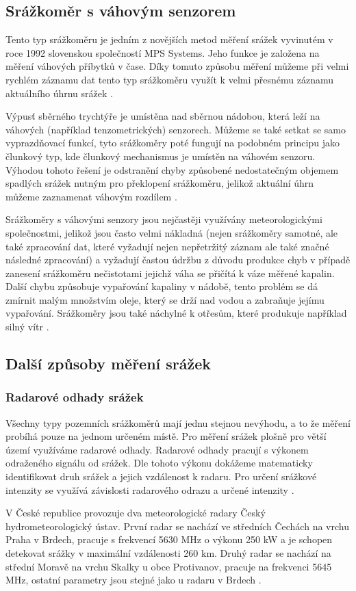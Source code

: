 \subsection{Srážkoměr s váhovým senzorem}
\par Tento typ srážkoměru je jedním z novějších metod měření srážek vyvinutém v roce 1992 slovenskou společností MPS Systems. Jeho funkce je založena na měření váhových příbytků v čase. Díky tomuto způsobu měření můžeme při velmi rychlém záznamu dat tento typ srážkoměru využít k velmi přesnému záznamu aktuálního úhrnu srážek \cite{ggXzrltWxOZUtGvb}.
\par Výpusť sběrného trychtýře je umístěna nad sběrnou nádobou, která leží na váhových (například tenzometrických) senzorech. Můžeme se také setkat se samo vyprazdňovací funkcí, tyto srážkoměry poté fungují na podobném principu jako člunkový typ, kde člunkový mechanismus je umístěn na váhovém senzoru. Výhodou tohoto řešení je odstranění chyby způsobené nedostatečným objemem spadlých srážek nutným pro překlopení srážkoměru, jelikož aktuální úhrn můžeme zaznamenat váhovým rozdílem \cite{ggXzrltWxOZUtGvb}. 
\par Srážkoměry s váhovými senzory jsou nejčastěji využívány meteorologickými společnostmi, jelikož jsou často velmi nákladná (nejen srážkoměry samotné, ale také zpracování dat, které vyžadují nejen nepřetržitý záznam ale také značné následné zpracování) a vyžadují častou údržbu z důvodu produkce chyb v případě zanesení srážkoměru nečistotami jejichž váha se přičítá k váze měřené kapalin. Další chybu způsobuje vypařování kapaliny v nádobě, tento problém se dá zmírnit malým množstvím oleje, který se drží nad vodou a zabraňuje jejímu vypařování. Srážkoměry jsou také náchylné k otřesům, které produkuje například silný vítr \cite{ggXzrltWxOZUtGvb}.

\subsection{Další způsoby měření srážek}

\subsubsection{Radarové odhady srážek}
\par Všechny typy pozemních srážkoměrů mají jednu stejnou nevýhodu, a to že měření probíhá pouze na jednom určeném místě. Pro měření srážek plošně pro větší území využíváme radarové odhady. 
Radarové odhady pracují s výkonem odraženého signálu od srážek. Dle tohoto výkonu dokážeme matematicky identifikovat druh srážek a jejich vzdálenost k radaru. Pro určení srážkové intenzity se využívá závislosti radarového odrazu a určené intenzity \cite{6eWEbsB9cSdSJAFB, Salek2012}.
\par V České republice provozuje dva meteorologické radary Český hydrometeorologický ústav. První radar se nachází ve středních Čechách na vrchu Praha v Brdech, pracuje s frekvencí 5630 MHz o výkonu 250 kW a je schopen detekovat srážky v maximální vzdálenosti 260 km. Druhý radar se nachází na střední Moravě na vrchu Skalky u obce Protivanov, pracuje na frekvenci 5645 MHz, ostatní parametry jsou stejné jako u radaru v Brdech \cite{KUiFYNNRR6FRo4R1}.

